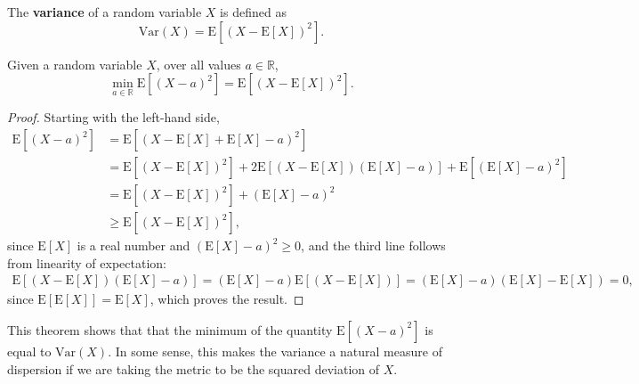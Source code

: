 \documentclass{statsmsc}
\newcommand{\consta}{a}
\newcommand{\X}{X}
\newcommand{\EE}[1]{ \mathrm{E} [ #1 ] }
\newcommand{\inparenth}[1]{\left( #1 \right)}
\begin{document}
\begin{definition}
    The \textbf{variance} of a random variable $X$ is defined as
    \begin{equation}
        \mathrm{Var}(X) = \mathrm{E}[(X - \mathrm{E}[X])^2].
    \end{equation}
\end{definition}

\begin{theorem}
    \label{thm:theorem1}
Given a random variable $X$, over all values $a \in \mathbb{R}$, 
\begin{equation}
    \min_{a \in \mathbb{R}} \mathrm{E}[(X - a)^2] 
    = \mathrm{E}[(X - \mathrm{E}[X])^2].
    \label{eqn:second}
\end{equation}
\end{theorem}

\begin{proof}   
    Starting with the left-hand side,
\begin{align}
\EE{ \inparenth{\X - \consta}^2 } 
&=  \EE{  \inparenth{\X - \EE{\X} + \EE{\X} - \consta}^2 } 
    \nonumber \\
&=  \EE{  \inparenth{ \X - \EE{\X} }^2 } 
    + 2 \EE{ \inparenth{ \X - \EE{\X} } \inparenth{ \EE{\X} - \consta} } +  
  \EE{ \inparenth{ \EE{\X} - \consta}^2  }    
    \nonumber \\
&=  \EE{  \inparenth{ \X - \EE{\X} }^2 } +  \inparenth{ \EE{\X} - \consta}^2
    \nonumber \\
& \geq \EE{  \inparenth{ \X - \EE{\X} }^2 },  
\nonumber 
\end{align}
since $\EE{\X}$ is a real number and $\inparenth{ \EE{\X} - \consta}^2 \geq 0$,
and the third line follows from linearity of expectation:
\begin{align}
    \EE{ \inparenth{ \X - \EE{\X} } \inparenth{ \EE{\X} - \consta} }
    =
    \inparenth{ \EE{\X} - \consta} \EE{ \inparenth{ \X - \EE{\X} } }
    =
    \inparenth{ \EE{\X} - \consta}  \inparenth{\EE{ \X} - \EE{\X} } 
    =
    0,
    \nonumber
\end{align}
    since $\EE{\EE{\X}} = \EE{\X}$, which proves the result.
\end{proof}

\begin{remark}
    This theorem shows that that the minimum of the quantity
    $\mathrm{E}[(X - a)^2]$ is equal to $\mathrm{Var}(X)$.
    In some sense, this makes the variance a natural measure of dispersion if 
    we are taking the metric to be the squared deviation of $X$.
\end{remark}
\end{document}
